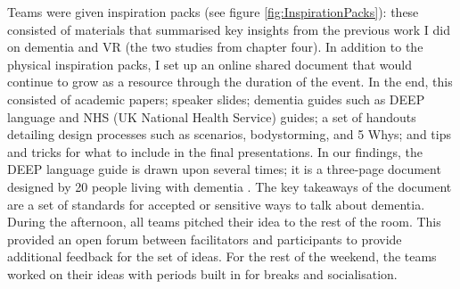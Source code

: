 Teams were given inspiration packs (see figure \ref{fig:InspirationPacks}): these consisted of materials that summarised key insights from the previous work I did on dementia and VR (the two studies from chapter four). In addition to the physical inspiration packs, I set up an online shared document that would continue to grow as a resource through the duration of the event. In the end, this consisted of academic papers; speaker slides; dementia guides such as DEEP language and NHS (UK National Health Service) guides; a set of handouts detailing design processes such as scenarios, bodystorming, and 5 Whys; and tips and tricks for what to include in the final presentations. In our findings, the DEEP language guide is drawn upon several times; it is a three-page document designed by 20 people living with dementia \citep{diaries_deep_2020}. The key takeaways of the document are a set of standards for accepted or sensitive ways to talk about dementia. During the afternoon, all teams pitched their idea to the rest of the room. This provided an open forum between facilitators and participants to provide additional feedback for the set of ideas. For the rest of the weekend, the teams worked on their ideas with periods built in for breaks and socialisation. 

